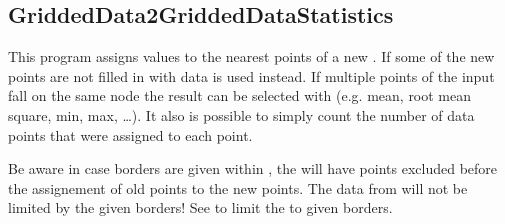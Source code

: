 \clearpage
\subsection{GriddedData2GriddedDataStatistics}\label{GriddedData2GriddedDataStatistics}
This program assigns values  to the nearest points
of a new . If some of the new points are not filled in with data
 is used instead. If multiple points of the input fall on the same node
the result can be selected with  (e.g. mean, root mean square, min, max, \ldots).
It also is possible to simply count the number of data points that were assigned to each point.

Be aware in case borders are given within , the  will have points excluded before the assignement of old points to the new points.
The data from  will not be limited by the given borders! See  to limit the
 to given borders.



